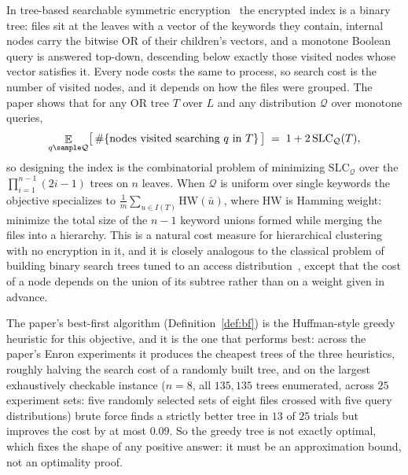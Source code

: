 \documentclass{conjura-conjecture}
\newcommand{\Qd}{\mathcal{Q}}
\newcommand{\SLC}{\mathrm{SLC}}
\newcommand{\HW}{\mathrm{HW}}
\newcommand{\Exp}{\mathop{\mathbb{E}}}
\begin{document}
In tree-based searchable symmetric encryption~\cite{Goh03,KP13,BlindSeer}
the encrypted index is a binary tree: files sit at the leaves with a
vector of the keywords they contain, internal nodes carry the bitwise OR
of their children's vectors, and a monotone Boolean query is answered
top-down, descending below exactly those visited nodes whose vector
satisfies it. Every node costs the same to process, so search cost is the
number of visited nodes, and it depends on how the files were grouped.
The paper shows that for any OR tree $T$ over $L$ and any distribution
$\Qd$ over monotone queries,
\[
  \Exp_{q \sample \Qd}\bigl[\,\#\{\text{nodes visited searching }
  q \text{ in } T\}\,\bigr] \;=\; 1 + 2\,\SLC_{\Qd}(T),
\]
so designing the index is the combinatorial problem of minimizing
$\SLC_{\Qd}$ over the $\prod_{i=1}^{n-1}(2i-1)$ trees on $n$ leaves. When
$\Qd$ is uniform over single keywords the objective specializes to
$\frac{1}{m}\sum_{u \in I(T)} \HW(\bar u)$, where $\HW$ is Hamming
weight: minimize the total size of the $n-1$ keyword unions formed while
merging the files into a hierarchy. This is a natural cost measure for
hierarchical clustering with no encryption in it, and it is closely
analogous to the classical problem of building binary search trees tuned
to an access distribution~\cite{Meh75,Nag97}, except that the cost of a
node depends on the union of its subtree rather than on a weight given in
advance.

The paper's best-first algorithm (Definition~\ref{def:bf}) is the
Huffman-style greedy heuristic for this objective, and it is the one that
performs best: across the paper's Enron experiments it produces the
cheapest trees of the three heuristics, roughly halving the search cost
of a randomly built tree, and on the largest exhaustively checkable
instance ($n=8$, all $135{,}135$ trees enumerated, across $25$ experiment
sets: five randomly selected sets of eight files crossed with five query
distributions) brute force finds a strictly better tree in $13$ of $25$
trials but improves the cost by at most $0.09$. So the greedy tree is not
exactly optimal, which fixes the shape of any positive answer: it must be
an approximation bound, not an optimality proof.
\end{document}
